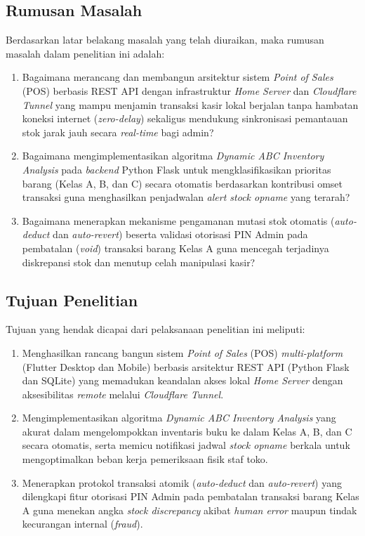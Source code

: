 \documentclass[11pt, a4paper]{article}
\begin{document}
\subsection{Rumusan Masalah}
Berdasarkan latar belakang masalah yang telah diuraikan, maka rumusan masalah dalam penelitian ini adalah:
\begin{enumerate}[label=\arabic*.]
    \item Bagaimana merancang dan membangun arsitektur sistem \textit{Point of Sales} (POS) berbasis REST API dengan infrastruktur \textit{Home Server} dan \textit{Cloudflare Tunnel} yang mampu menjamin transaksi kasir lokal berjalan tanpa hambatan koneksi internet (\textit{zero-delay}) sekaligus mendukung sinkronisasi pemantauan stok jarak jauh secara \textit{real-time} bagi admin?
    \item Bagaimana mengimplementasikan algoritma \textit{Dynamic ABC Inventory Analysis} pada \textit{backend} Python Flask untuk mengklasifikasikan prioritas barang (Kelas A, B, dan C) secara otomatis berdasarkan kontribusi omset transaksi guna menghasilkan penjadwalan \textit{alert stock opname} yang terarah?
    \item Bagaimana menerapkan mekanisme pengamanan mutasi stok otomatis (\textit{auto-deduct} dan \textit{auto-revert}) beserta validasi otorisasi PIN Admin pada pembatalan (\textit{void}) transaksi barang Kelas A guna mencegah terjadinya diskrepansi stok dan menutup celah manipulasi kasir?
\end{enumerate}

\subsection{Tujuan Penelitian}
Tujuan yang hendak dicapai dari pelaksanaan penelitian ini meliputi:
\begin{enumerate}[label=\arabic*.]
    \item Menghasilkan rancang bangun sistem \textit{Point of Sales} (POS) \textit{multi-platform} (Flutter Desktop dan Mobile) berbasis arsitektur REST API (Python Flask dan SQLite) yang memadukan keandalan akses lokal \textit{Home Server} dengan aksesibilitas \textit{remote} melalui \textit{Cloudflare Tunnel}.
    \item Mengimplementasikan algoritma \textit{Dynamic ABC Inventory Analysis} yang akurat dalam mengelompokkan inventaris buku ke dalam Kelas A, B, dan C secara otomatis, serta memicu notifikasi jadwal \textit{stock opname} berkala untuk mengoptimalkan beban kerja pemeriksaan fisik staf toko.
    \item Menerapkan protokol transaksi atomik (\textit{auto-deduct} dan \textit{auto-revert}) yang dilengkapi fitur otorisasi PIN Admin pada pembatalan transaksi barang Kelas A guna menekan angka \textit{stock discrepancy} akibat \textit{human error} maupun tindak kecurangan internal (\textit{fraud}).
\end{enumerate}
\end{document}
